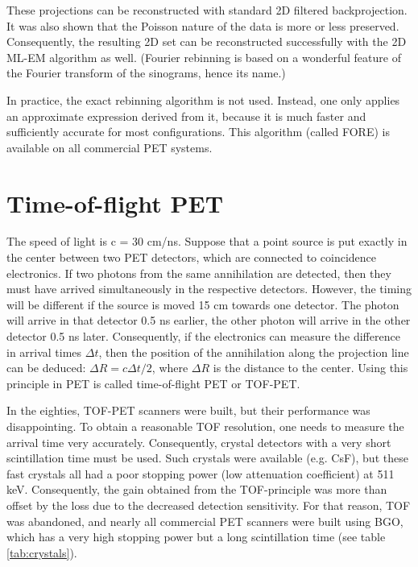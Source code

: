 These projections can be reconstructed with standard 2D filtered
backprojection.  It was also shown that the Poisson nature of the data
is more or less preserved.  Consequently, the resulting 2D set can be
reconstructed successfully with the 2D ML-EM algorithm as
well. (Fourier rebinning is based on a wonderful feature of the
Fourier transform of the sinograms, hence its name.)

In practice, the exact rebinning algorithm is not used. Instead, one
only applies an approximate expression derived from it, because it is
much faster and sufficiently accurate for most configurations. This
algorithm (called FORE) is available on all commercial PET systems.

\section{Time-of-flight PET} \label{sec:TOF}
The speed of light is c = 30 cm/ns. Suppose that a point source is put
exactly in the center between two PET detectors, which are connected
to coincidence electronics. If two photons from the same annihilation
are detected, then they must have arrived simultaneously in the
respective detectors. However, the timing will be different if the
source is moved 15 cm towards one detector. The photon will arrive in
that detector 0.5 ns earlier, the other photon will arrive in the
other detector 0.5 ns later. Consequently, if the electronics can
measure the difference in arrival times $\Delta t$, then the position
of the annihilation along the projection line can be deduced: $\Delta
R = c \Delta t / 2$, where $\Delta R$ is the distance to the
center. Using this principle in PET is called time-of-flight PET or
TOF-PET.

In the eighties, TOF-PET scanners were built, but their performance
was disappointing. To obtain a reasonable TOF resolution, one needs to
measure the arrival time very accurately. Consequently, crystal
detectors with a very short scintillation time must be used. Such
crystals were available (e.g. CsF), but these fast crystals all had a
poor stopping power (low attenuation coefficient) at 511
keV. Consequently, the gain obtained from the TOF-principle was more
than offset by the loss due to the decreased detection
sensitivity. For that reason, TOF was abandoned, and nearly all
commercial PET scanners were built using BGO, which has a very high
stopping power but a long scintillation time (see table
\ref{tab:crystals}).

